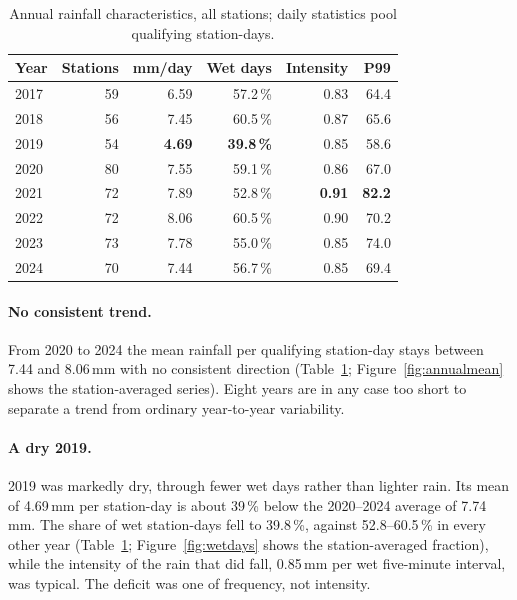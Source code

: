\documentclass[10pt,a4paper,twocolumn,twoside]{rho-class/rho}
\begin{document}
\begin{table}[H]
\caption{Annual rainfall characteristics, all stations; daily statistics pool qualifying station-days.}
\label{tab:yearly}
\centering
\scriptsize
\setlength{\tabcolsep}{2.5pt}
\begin{tabular}{lrrrrr}
\toprule
\textbf{Year} & \textbf{Stations} & \textbf{mm/day} & \textbf{Wet days} & \textbf{Intensity} & \textbf{P99} \\
\midrule
2017 & 59 & 6.59 & 57.2\,\% & 0.83 & 64.4 \\
2018 & 56 & 7.45 & 60.5\,\% & 0.87 & 65.6 \\
2019 & 54 & \textbf{4.69} & \textbf{39.8\,\%} & 0.85 & 58.6 \\
2020 & 80 & 7.55 & 59.1\,\% & 0.86 & 67.0 \\
2021 & 72 & 7.89 & 52.8\,\% & \textbf{0.91} & \textbf{82.2} \\
2022 & 72 & 8.06 & 60.5\,\% & 0.90 & 70.2 \\
2023 & 73 & 7.78 & 55.0\,\% & 0.85 & 74.0 \\
2024 & 70 & 7.44 & 56.7\,\% & 0.85 & 69.4 \\
\bottomrule
\end{tabular}
\end{table}

\paragraph{No consistent trend.} From 2020 to 2024 the mean rainfall per qualifying station-day stays between 7.44 and 8.06\,mm with no consistent direction (Table~\ref{tab:yearly}; Figure~\ref{fig:annualmean} shows the station-averaged series). Eight years are in any case too short to separate a trend from ordinary year-to-year variability.

\paragraph{A dry 2019.} 2019 was markedly dry, through fewer wet days rather than lighter rain. Its mean of 4.69\,mm per station-day is about 39\,\% below the 2020--2024 average of 7.74\,mm. The share of wet station-days fell to 39.8\,\%, against 52.8--60.5\,\% in every other year (Table~\ref{tab:yearly}; Figure~\ref{fig:wetdays} shows the station-averaged fraction), while the intensity of the rain that did fall, 0.85\,mm per wet five-minute interval, was typical. The deficit was one of frequency, not intensity.
\end{document}
